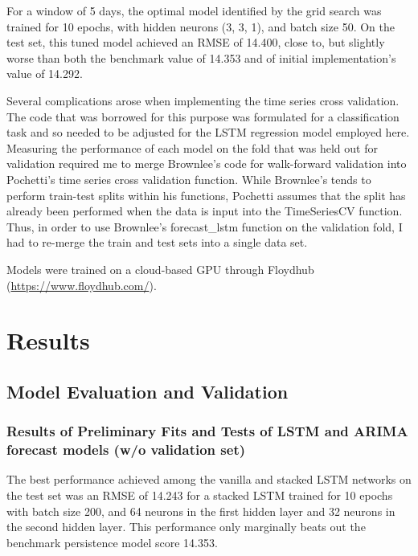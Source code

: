 \documentclass{article}
\begin{document}
For a window of 5 days, the optimal model identified by the grid search was trained for 10 epochs, with hidden neurons (3, 3, 1), and batch size 50. On the test set, this tuned model achieved an RMSE of 14.400, close to, but slightly worse than both the benchmark value of 14.353 and of initial implementation's value of 14.292. 

Several complications arose when implementing the time series cross validation. The code that was borrowed for this purpose was formulated for a classification task and so needed to be adjusted for the LSTM regression model employed here. Measuring the performance of each model on the fold that was held out for validation required me to merge Brownlee's code for walk-forward validation into Pochetti's time series cross validation function. While Brownlee's tends to perform train-test splits within his functions, Pochetti assumes that the split has already been performed when the data is input into the TimeSeriesCV function. Thus, in order to use Brownlee's forecast\_lstm function on the validation fold, I had to re-merge the train and test sets into a single data set. 

Models were trained on a cloud-based GPU through Floydhub (\url{https://www.floydhub.com/}).









\section{Results}
\subsection{Model Evaluation and Validation}
\subsubsection{Results of Preliminary Fits and Tests of LSTM and ARIMA forecast models (w/o validation set)}

The best performance achieved among the vanilla and stacked LSTM networks on the test set was an RMSE of 14.243 for a stacked LSTM trained for 10 epochs with batch size 200, and 64 neurons in the first hidden layer and 32 neurons in the second hidden layer. This performance only marginally beats out the benchmark persistence model score 14.353.
\end{document}
